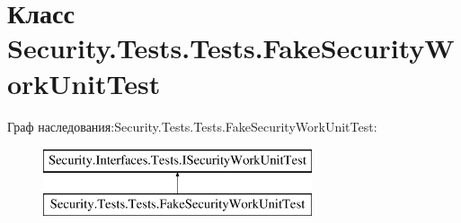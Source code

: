 \hypertarget{class_security_1_1_tests_1_1_tests_1_1_fake_security_work_unit_test}{}\section{Класс Security.\+Tests.\+Tests.\+Fake\+Security\+Work\+Unit\+Test}
\label{class_security_1_1_tests_1_1_tests_1_1_fake_security_work_unit_test}
Граф наследования\+:Security.\+Tests.\+Tests.\+Fake\+Security\+Work\+Unit\+Test\+:\begin{figure}[H]
\begin{center}
\leavevmode
\includegraphics[height=2.000000cm]{de/db0/class_security_1_1_tests_1_1_tests_1_1_fake_security_work_unit_test}
\end{center}
\end{figure}
